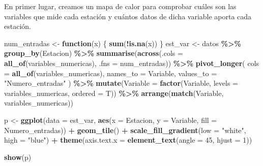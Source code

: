 \documentclass[notspecified,article,submit,moreauthors,pdftex]{Definitions/mdpi}
\newenvironment{Shaded}{\begin{snugshade}}{\end{snugshade}}
\newcommand{\AttributeTok}[1]{\textcolor[rgb]{0.13,0.29,0.53}{#1}}
\newcommand{\ControlFlowTok}[1]{\textcolor[rgb]{0.13,0.29,0.53}{\textbf{#1}}}
\newcommand{\DecValTok}[1]{\textcolor[rgb]{0.00,0.00,0.81}{#1}}
\newcommand{\FunctionTok}[1]{\textcolor[rgb]{0.13,0.29,0.53}{\textbf{#1}}}
\newcommand{\NormalTok}[1]{#1}
\newcommand{\OtherTok}[1]{\textcolor[rgb]{0.56,0.35,0.01}{#1}}
\newcommand{\SpecialCharTok}[1]{\textcolor[rgb]{0.81,0.36,0.00}{\textbf{#1}}}
\newcommand{\StringTok}[1]{\textcolor[rgb]{0.31,0.60,0.02}{#1}}
\begin{document}
En primer lugar, creamos un mapa de calor para comprobar cuáles son las
variables que mide cada estación y cuántos datos de dicha variable
aporta cada estación.

\begin{Shaded}
\begin{Highlighting}[]
\NormalTok{num\_entradas }\OtherTok{\textless{}{-}} \ControlFlowTok{function}\NormalTok{(x) \{}
  \FunctionTok{sum}\NormalTok{(}\SpecialCharTok{!}\FunctionTok{is.na}\NormalTok{(x))}
\NormalTok{\}}
\NormalTok{est\_var }\OtherTok{\textless{}{-}}\NormalTok{ datos }\SpecialCharTok{\%\textgreater{}\%}
  \FunctionTok{group\_by}\NormalTok{(Estacion) }\SpecialCharTok{\%\textgreater{}\%}
  \FunctionTok{summarise}\NormalTok{(}\FunctionTok{across}\NormalTok{(}\AttributeTok{.cols =} \FunctionTok{all\_of}\NormalTok{(variables\_numericas), }\AttributeTok{.fns =}\NormalTok{ num\_entradas)) }\SpecialCharTok{\%\textgreater{}\%}
  \FunctionTok{pivot\_longer}\NormalTok{(}
    \AttributeTok{cols =} \FunctionTok{all\_of}\NormalTok{(variables\_numericas),}
    \AttributeTok{names\_to =} \StringTok{\textquotesingle{}Variable\textquotesingle{}}\NormalTok{,}
    \AttributeTok{values\_to =} \StringTok{"Numero\_entradas"}
\NormalTok{  ) }\SpecialCharTok{\%\textgreater{}\%}
  \FunctionTok{mutate}\NormalTok{(}\AttributeTok{Variable =} \FunctionTok{factor}\NormalTok{(Variable, }\AttributeTok{levels =}\NormalTok{ variables\_numericas, }\AttributeTok{ordered =}\NormalTok{ T)) }\SpecialCharTok{\%\textgreater{}\%}
  \FunctionTok{arrange}\NormalTok{(}\FunctionTok{match}\NormalTok{(Variable, variables\_numericas))}

\NormalTok{p }\OtherTok{\textless{}{-}}
  \FunctionTok{ggplot}\NormalTok{(}\AttributeTok{data =}\NormalTok{ est\_var, }\FunctionTok{aes}\NormalTok{(}\AttributeTok{x =}\NormalTok{ Estacion, }\AttributeTok{y =}\NormalTok{ Variable, }\AttributeTok{fill =}\NormalTok{ Numero\_entradas)) }\SpecialCharTok{+}
  \FunctionTok{geom\_tile}\NormalTok{() }\SpecialCharTok{+} \FunctionTok{scale\_fill\_gradient}\NormalTok{(}\AttributeTok{low =} \StringTok{"white"}\NormalTok{, }\AttributeTok{high =} \StringTok{"blue"}\NormalTok{) }\SpecialCharTok{+}
  \FunctionTok{theme}\NormalTok{(}\AttributeTok{axis.text.x =} \FunctionTok{element\_text}\NormalTok{(}\AttributeTok{angle =} \DecValTok{45}\NormalTok{, }\AttributeTok{hjust =} \DecValTok{1}\NormalTok{))}

\FunctionTok{show}\NormalTok{(p)}
\end{Highlighting}
\end{Shaded}
\end{document}
